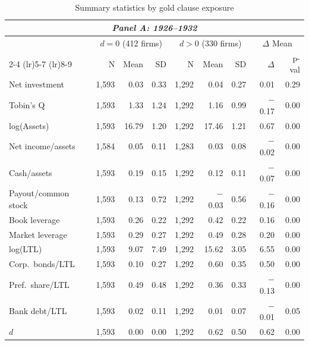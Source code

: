 \begin{table}[p]\centering
    \caption{\\ Summary statistics by gold clause exposure}
    \scriptsize
    \label{tab:sum_stats_d}
    
    \begin{threeparttable}
        \begin{tabular}{l rrr rrr rr}
            \toprule
            \multicolumn{9}{c}{\textit{Panel A: 1926--1932}} \\
            \midrule
             & \multicolumn{3}{c}{$d = 0$ (412 firms)} & \multicolumn{3}{c}{$d > 0$ (330 firms)} & \multicolumn{2}{c}{$\Delta$ Mean} \\
            \cmidrule(lr){2-4} \cmidrule(lr){5-7} \cmidrule(lr){8-9}
             & N & Mean & SD & N & Mean & SD & $\Delta$ & p-val \\
            Net investment & 1,593 & 0.03 & 0.33 & 1,292 & 0.04 & 0.27 & 0.01 & 0.29 \\
            Tobin's Q & 1,593 & 1.33 & 1.24 & 1,292 & 1.16 & 0.99 & $-$0.17 & 0.00 \\
            log(Assets) & 1,593 & 16.79 & 1.20 & 1,292 & 17.46 & 1.21 & 0.67 & 0.00 \\
            Net income/assets & 1,584 & 0.05 & 0.11 & 1,283 & 0.03 & 0.08 & $-$0.02 & 0.00 \\
            Cash/assets & 1,593 & 0.19 & 0.15 & 1,292 & 0.12 & 0.11 & $-$0.07 & 0.00 \\
            Payout/common stock & 1,593 & 0.13 & 0.72 & 1,292 & $-$0.03 & 0.56 & $-$0.16 & 0.00 \\
            Book leverage & 1,593 & 0.26 & 0.22 & 1,292 & 0.42 & 0.22 & 0.16 & 0.00 \\
            Market leverage & 1,593 & 0.29 & 0.27 & 1,292 & 0.49 & 0.28 & 0.20 & 0.00 \\
            log(LTL) & 1,593 & 9.07 & 7.49 & 1,292 & 15.62 & 3.05 & 6.55 & 0.00 \\
            Corp.\ bonds/LTL & 1,593 & 0.10 & 0.27 & 1,292 & 0.60 & 0.35 & 0.50 & 0.00 \\
            Pref.\ share/LTL & 1,593 & 0.49 & 0.48 & 1,292 & 0.36 & 0.33 & $-$0.13 & 0.00 \\
            Bank debt/LTL & 1,593 & 0.02 & 0.11 & 1,292 & 0.01 & 0.07 & $-$0.01 & 0.05 \\
            \ensuremath{d} & 1,593 & 0.00 & 0.00 & 1,292 & 0.62 & 0.50 & 0.62 & 0.00 \\
            \midrule

\end{tabular}
\end{threeparttable}
\end{table}
